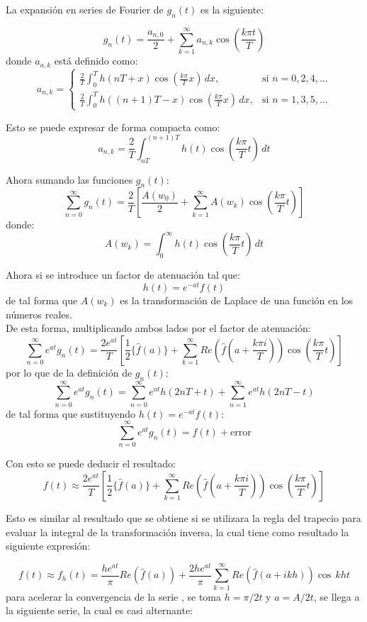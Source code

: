 \documentclass[11pt]{article}
\numberwithin{equation}{section} %
\begin{document}
La expansión en series de Fourier de $g_n(t)$ es la siguiente:

\[
g_n(t)=\frac{a_{n,0}}{2}+\sum_{k=1}^{\infty}a_{n,k}\cos\left(\frac{k\pi t}{T}\right)
\]
donde $a_{a,k}$ está definido como:
\[
a_{n,k} =
\begin{cases}
\displaystyle \frac{2}{T}\int_0^T h(nT+x)\cos\left(\frac{k\pi}{T}x\right)\,dx, & \mbox{si } n=0,2,4,\ldots \\
\displaystyle \frac{2}{T}\int_0^T h((n+1)T-x)\cos\left(\frac{k\pi}{T}x\right)\,dx, & \mbox{si } n=1,3,5,\ldots
\end{cases}
\]

Esto se puede expresar de forma compacta como:
\[
a_{n,k}=\frac{2}{T}\int_{nT}^{(n+1)T} h(t)\cos\left(\frac{k\pi}{T}t\right)\,dt
\]

Ahora sumando las funciones $g_n(t)$:
\[
\sum_{n=0}^{\infty}g_n(t)=\frac{2}{T}\left[\frac{A(w_0)}{2}+\sum_{k=1}^{\infty}A(w_k)\cos\left(\frac{k\pi}{T}t\right)\right]
\]
donde:
\[
A(w_k)=\int_0^\infty h(t)\cos\left(\frac{k\pi}{T}t\right)\,dt
\]

Ahora si se introduce un factor de atenuación tal que:
\[
h(t)=e^{-at}f(t)
\]
de tal forma que $A(w_k)$ es la transformación de Laplace de una función en los números reales.\\

De esta forma, multiplicando ambos lados por el factor de atenuación:
\[
\sum_{n=0}^{\infty}e^{at}g_n(t)=\frac{2e^{at}}{T}\left[\frac{1}{2} \{\hat{f}(a) \}+\sum_{k=1}^{\infty}Re\left(\hat{f}\left(a+\frac{k\pi i}{T}\right)\right)\cos\left(\frac{k\pi}{T}t\right)\right]
\]
por lo que de la definición de $g_n(t)$:
\[
\sum_{n=0}^{\infty}e^{at}g_n(t)=\sum_{n=0}^{\infty}e^{at}h(2nT+t)+\sum_{n=1}^{\infty}e^{at}h(2nT-t)
\]
de tal forma que sustituyendo $h(t)=e^{-at}f(t)$:
\[
\sum_{n=0}^{\infty}e^{at}g_n(t) = f(t) + \text{error}
\]

Con esto se puede deducir el resultado:
\begin{equation}
f(t) \approx \frac{2e^{at}}{T}\left[\frac{1}{2} \{\hat{f}(a) \}+\sum_{k=1}^{\infty}Re\left(\hat{f}\left(a+\frac{k\pi i}{T}\right)\right)\cos\left(\frac{k\pi}{T}t\right)\right]
\end{equation}

Esto es similar al resultado que se obtiene si se utilizara la regla del trapecio para evaluar la integral de la transformación inversa, la cual tiene como resultado la siguiente expresión:

\[
f(t)\approx f_h(t)=\frac{he^{at}}{\pi} Re(\hat{f}(a))+\frac{2he^{at}}{\pi}\sum_{k=1}^{\infty}Re(\hat{f}(a+ikh))\cos\,kht
\]
para acelerar la convergencia de la serie \cite{abate1995}, se toma $h=\pi/2t$ y $a=A/2t$, se llega a la siguiente serie, la cual es casi alternante:
\end{document}
